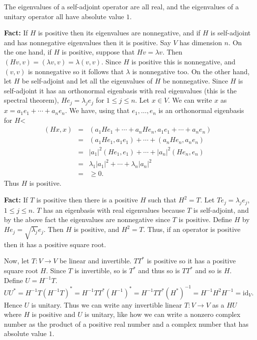 \documentclass{article}
\newcommand{\id}{\textrm{id}}
\begin{document}
The eigenvalues of a self-adjoint operator are all real, and the eigenvalues of a unitary operator all have absolute value $1$.

\textbf{Fact:} If $H$ is positive then its eigenvalues are nonnegative, and if $H$ is self-adjoint and has nonnegative eigenvalues then it is positive. Say $V$ has
dimension $n$. On the one hand,
if $H$ is positive, suppose that $Hv=\lambda v$. Then $(Hv,v)=(\lambda v,v)=\lambda (v,v)$. Since $H$ is positive this is nonnegative, and $(v,v)$ is nonnegative so it follows that
$\lambda$ is nonnegative too. On the other hand, let $H$ be self-adjoint and let all the eigenvalues of $H$ be nonnegative. Since $H$ is self-adjoint it has an orthonormal eigenbasis
with real eigenvalues
(this is the spectral theorem), $He_j=\lambda_j e_j$ for $1 \leq j \leq n$. Let $x \in V$. We can write $x$ as $x=a_1e_1+ \cdots+ a_ne_n$. We have, using that $e_1,\ldots,e_n$ is an
orthonormal eigenbasis for $H$<
\begin{eqnarray*}
(Hx,x)&=&(a_1He_1+\cdots+a_nHe_n,a_1e_1+\cdots+a_ne_n)\\
&=&(a_1He_1,a_1e_1)+\cdots+(a_nHe_n,a_ne_n)\\
&=&|a_1|^2(He_1,e_1)+\cdots+|a_n|^2(He_n,e_n)\\
&=&\lambda_1 |a_1|^2+\cdots+\lambda_n |a_n|^2\\
&=&\geq 0.
\end{eqnarray*}
Thus $H$ is positive.

\textbf{Fact:} If $T$ is positive then there is a positive $H$ such that $H^2=T$. Let $Te_j=\lambda_j e_j$, $1 \leq j \leq n$. $T$ has an eigenbasis with real eigenvalues because
$T$ is self-adjoint, and by the above fact the eigenvalues are nonnegative since $T$ is positive. Define $H$ by $He_j=\sqrt{\lambda_j} e_j$. Then $H$ is positive, and
$H^2=T$. Thus, if an operator is positive then it has a positive square root. 

Now, let $T:V \to V$ be linear and invertible. $TT^*$ is positive so it has a positive square root $H$. Since $T$ is invertible, so is $T^*$ and thus so is $TT^*$ and so is $H$. Define
$U=H^{-1}T$. 
\[
UU^*=H^{-1}T(H^{-1}T)^*=H^{-1}TT^* (H^{-1})^*=H^{-1}TT^* (H^*)^{-1}=H^{-1}H^2 H^{-1}=\id_V.
\]
Hence $U$ is unitary. Thus we can write any invertible linear $T:V \to V$ as a $HU$ where $H$ is positive and $U$ is unitary, like how we can write a nonzero complex
number as the product of a positive real number and a complex number that has absolute value $1$.
\end{document}

